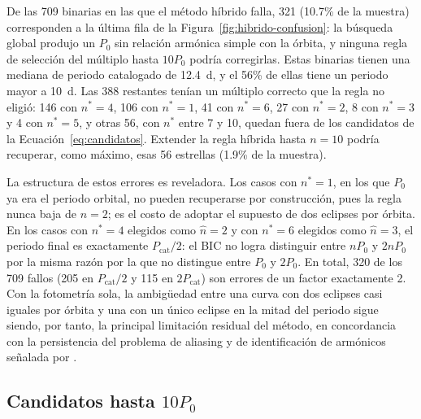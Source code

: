 \documentclass[12pt,letterpaper,oneside]{book}
\begin{document}
De las 709 binarias en las que el m\'etodo h\'ibrido falla, 321 (10.7\% de la muestra) corresponden a la \'ultima fila de la Figura~\ref{fig:hibrido-confusion}: la b\'usqueda global produjo un $P_0$ sin relaci\'on arm\'onica simple con la \'orbita, y ninguna regla de selecci\'on del m\'ultiplo hasta $10P_0$ podr\'ia corregirlas. Estas binarias tienen una mediana de periodo catalogado de 12.4~d, y el 56\% de ellas tiene un periodo mayor a 10~d. Las 388 restantes ten\'ian un m\'ultiplo correcto que la regla no eligi\'o: 146 con $n^\ast=4$, 106 con $n^\ast=1$, 41 con $n^\ast=6$, 27 con $n^\ast=2$, 8 con $n^\ast=3$ y 4 con $n^\ast=5$, y otras 56, con $n^\ast$ entre 7 y 10, quedan fuera de los candidatos de la Ecuaci\'on~\eqref{eq:candidatos}. Extender la regla h\'ibrida hasta $n=10$ podr\'ia recuperar, como m\'aximo, esas 56 estrellas (1.9\% de la muestra).

La estructura de estos errores es reveladora. Los casos con $n^\ast=1$, en los que $P_0$ ya era el periodo orbital, no pueden recuperarse por construcci\'on, pues la regla nunca baja de $n=2$; es el costo de adoptar el supuesto de dos eclipses por \'orbita. En los casos con $n^\ast=4$ elegidos como $\hat n=2$ y con $n^\ast=6$ elegidos como $\hat n=3$, el periodo final es exactamente $P_{\mathrm{cat}}/2$: el BIC no logra distinguir entre $nP_0$ y $2nP_0$ por la misma raz\'on por la que no distingue entre $P_0$ y $2P_0$. En total, 320 de los 709 fallos (205 en $P_{\mathrm{cat}}/2$ y 115 en $2P_{\mathrm{cat}}$) son errores de un factor exactamente 2. Con la fotometr\'ia sola, la ambig\"uedad entre una curva con dos eclipses casi iguales por \'orbita y una con un \'unico eclipse en la mitad del periodo sigue siendo, por tanto, la principal limitaci\'on residual del m\'etodo, en concordancia con la persistencia del problema de aliasing y de identificaci\'on de arm\'onicos se\~nalada por \citet{Graham2013}.

\subsection{Candidatos hasta $10P_0$}
\label{sec:hibrido-hasta-10}
\end{document}
